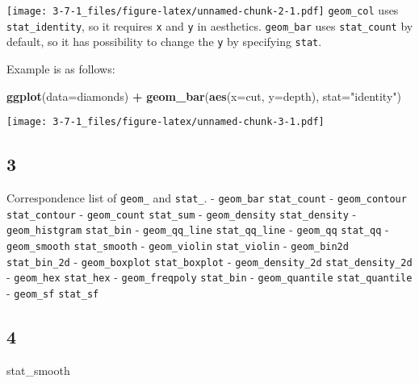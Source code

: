 \documentclass[]{article}
\newenvironment{Shaded}{\begin{snugshade}}{\end{snugshade}}
\newcommand{\DataTypeTok}[1]{\textcolor[rgb]{0.13,0.29,0.53}{#1}}
\newcommand{\KeywordTok}[1]{\textcolor[rgb]{0.13,0.29,0.53}{\textbf{#1}}}
\newcommand{\NormalTok}[1]{#1}
\newcommand{\OperatorTok}[1]{\textcolor[rgb]{0.81,0.36,0.00}{\textbf{#1}}}
\newcommand{\StringTok}[1]{\textcolor[rgb]{0.31,0.60,0.02}{#1}}
\begin{document}
\texttt{[image: 3-7-1\_files/figure-latex/unnamed-chunk-2-1.pdf]}
\texttt{geom\_col} uses \texttt{stat\_identity}, so it requires
\texttt{x} and \texttt{y} in aesthetics. \texttt{geom\_bar} uses
\texttt{stat\_count} by default, so it has possibility to change the
\texttt{y} by specifying \texttt{stat}.

Example is as follows:

\begin{Shaded}
\begin{Highlighting}[]
\KeywordTok{ggplot}\NormalTok{(}\DataTypeTok{data=}\NormalTok{diamonds) }\OperatorTok{+}
\StringTok{    }\KeywordTok{geom_bar}\NormalTok{(}\KeywordTok{aes}\NormalTok{(}\DataTypeTok{x=}\NormalTok{cut, }\DataTypeTok{y=}\NormalTok{depth), }\DataTypeTok{stat=}\StringTok{"identity"}\NormalTok{)}
\end{Highlighting}
\end{Shaded}

\texttt{[image: 3-7-1\_files/figure-latex/unnamed-chunk-3-1.pdf]}

\hypertarget{section-3}{%
\subsection{3}\label{section-3}}

Correspondence list of \texttt{geom\_} and \texttt{stat\_}. -
\texttt{geom\_bar} \texttt{stat\_count} - \texttt{geom\_contour}
\texttt{stat\_contour} - \texttt{geom\_count} \texttt{stat\_sum} -
\texttt{geom\_density} \texttt{stat\_density} - \texttt{geom\_histgram}
\texttt{stat\_bin} - \texttt{geom\_qq\_line} \texttt{stat\_qq\_line} -
\texttt{geom\_qq} \texttt{stat\_qq} - \texttt{geom\_smooth}
\texttt{stat\_smooth} - \texttt{geom\_violin} \texttt{stat\_violin} -
\texttt{geom\_bin2d} \texttt{stat\_bin\_2d} - \texttt{geom\_boxplot}
\texttt{stat\_boxplot} - \texttt{geom\_density\_2d}
\texttt{stat\_density\_2d} - \texttt{geom\_hex} \texttt{stat\_hex} -
\texttt{geom\_freqpoly} \texttt{stat\_bin} - \texttt{geom\_quantile}
\texttt{stat\_quantile} - \texttt{geom\_sf} \texttt{stat\_sf}

\hypertarget{section-4}{%
\subsection{4}\label{section-4}}

\begin{Shaded}
\begin{Highlighting}[]
\NormalTok{stat_smooth}
\end{Highlighting}
\end{Shaded}
\end{document}
